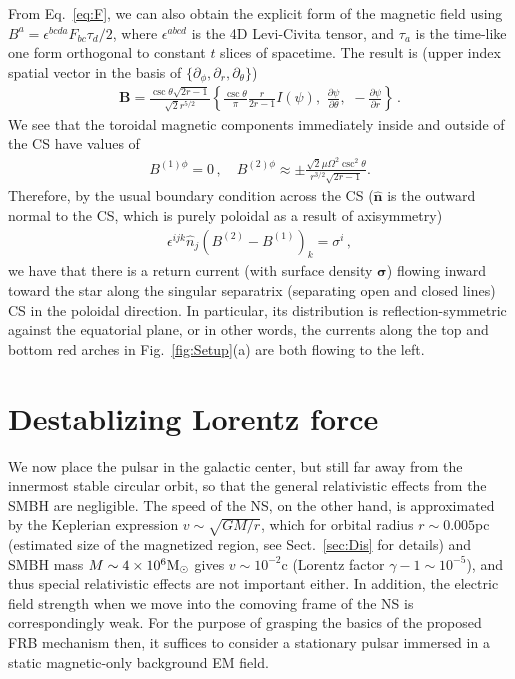 \documentclass{aa}
\newcommand{\bea}{\begin{eqnarray}}
\newcommand{\eea}{\end{eqnarray}}
\begin{document}
From Eq.~\eqref{eq:F}, we can also obtain the explicit form of the magnetic field using $B^a =\epsilon^{bcda}F_{bc}\tau_d/2$, where $\epsilon^{abcd}$ is the 4D Levi-Civita tensor, and $\tau_a$ is the time-like one form orthogonal to constant $t$ slices of spacetime. The result is (upper index spatial vector in the basis of $\{\partial_{\phi},\partial_r,\partial_{\theta}\}$)
\bea \label{eq:Mag}
\bm{B} = \frac{\csc \theta\sqrt{2r-1}}{\sqrt{2} r^{5/2}}  
\left\{
\frac{\csc \theta }{\pi} \frac{r}{2r-1}I(\psi), \,\,
\frac{\partial \psi }{\partial \theta},\,\,
-\frac{\partial \psi}{\partial r}
\right\}\,.
\eea
We see that the toroidal magnetic components immediately  inside and outside of the CS have values of 
\bea \label{eq:Btoroidal}
B^{(1)\phi} =0\,, \quad 
B^{(2){\phi}} \approx 
\pm \frac{\sqrt{2}\mu \Omega^2\csc^2\theta }{r^{3/2}\sqrt{2r-1}}
.\eea
Therefore, by the usual boundary condition across the CS ($\bm{\hat{n}}$ is the outward normal to the CS, which is purely poloidal as
a result of axisymmetry)
\bea \label{eq:CurrentDensity}
\epsilon^{ijk} \hat{n}_{j} \left({B}^{(2)}-{B}^{(1)} \right)_k = \sigma^i\,,
\eea
we have that there is a return current (with surface density ${\bm \sigma}$) flowing inward toward the star along the singular separatrix (separating open and closed lines) CS in the poloidal direction. In particular, its distribution is reflection-symmetric against the equatorial plane, or in other words, the currents along the top and bottom red arches in Fig.~\ref{fig:Setup}(a) are both flowing to the left. 


\section{Destablizing Lorentz force} \label{sec:Force}
We now place the pulsar in the galactic center, but still far away from the innermost stable circular orbit, so that the general relativistic effects from the SMBH are negligible. The speed of the NS, on the other hand, is approximated by the Keplerian expression $v \sim \sqrt{GM/r}$, which for orbital radius $r \sim 0.005$pc (estimated size of the magnetized region, see Sect.~\ref{sec:Dis} for details) and SMBH mass $M\sim 4\times 10^6{\rm M}_{\odot}$ gives $v \sim 10^{-2}$c (Lorentz factor $\gamma-1 \sim 10^{-5}$), and thus special relativistic effects are not important either. In addition, the electric field strength when we move into the comoving frame of the NS is correspondingly weak. For the purpose of grasping the basics of the proposed FRB mechanism then, it suffices to consider a stationary pulsar immersed in a static magnetic-only background EM field. 
\end{document}
